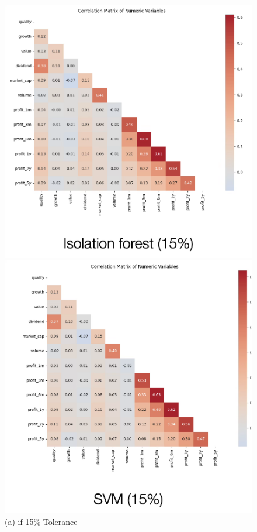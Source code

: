 \documentclass[11pt,english,a4paper,hidelinks]{book}
\begin{document}
\begin{figure}[H]
    \centering
    \begin{minipage}{0.32\textwidth}
        \centering
        \includegraphics[width=\textwidth]{images/code/outliers/IF 15.png}
        \caption*{(a) \acrshort{if} 15\% Tolerance}
    \end{minipage}
    \hfill
    \begin{minipage}{0.32\textwidth}
        \centering
        \includegraphics[width=\textwidth]{images/code/outliers/SVM 15.png}

\end{minipage}
\end{figure}
\end{document}
